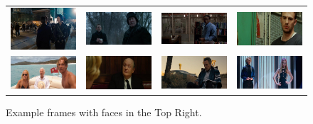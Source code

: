 \begin{figure}
\begin{center}
\begin{tabular}{cccc}
\includegraphics[width=0.2\linewidth]
  {fig/pos/09.jpg} 
& \includegraphics[width=0.2\linewidth]
  {fig/pos/04.jpg}  
& \includegraphics[width=0.2\linewidth]
  {fig/pos/15.jpg}   
& \includegraphics[width=0.2\linewidth]
  {fig/pos/10.jpg}
\\
\includegraphics[width=0.2\linewidth]
  {fig/pos/13.jpg} 
& \includegraphics[width=0.2\linewidth]
  {fig/pos/14.jpg}  
& \includegraphics[width=0.2\linewidth]
  {fig/pos/03.jpg}   
& \includegraphics[width=0.2\linewidth]
  {fig/pos/16.jpg}
\\
\end{tabular}
\end{center}
   \caption{Example frames with faces in the Top Right.}
\label{fig:topRight}
\end{figure}


